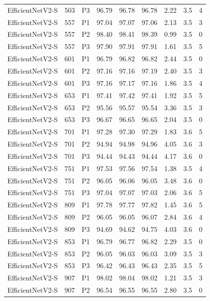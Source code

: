 {\begin{longtable}{lrlrrrrrr}
EfficientNetV2-S & 503 & P3 & 96.79 & 96.78 & 96.78 & 2.22 & 3.5 & 4 \\
EfficientNetV2-S & 557 & P1 & 97.04 & 97.07 & 97.06 & 2.13 & 3.5 & 3 \\
EfficientNetV2-S & 557 & P2 & 98.40 & 98.41 & 98.39 & 0.99 & 3.5 & 0 \\
EfficientNetV2-S & 557 & P3 & 97.90 & 97.91 & 97.91 & 1.61 & 3.5 & 5 \\
EfficientNetV2-S & 601 & P1 & 96.79 & 96.82 & 96.82 & 2.44 & 3.5 & 0 \\
EfficientNetV2-S & 601 & P2 & 97.16 & 97.16 & 97.19 & 2.40 & 3.5 & 3 \\
EfficientNetV2-S & 601 & P3 & 97.16 & 97.17 & 97.16 & 1.86 & 3.5 & 4 \\
EfficientNetV2-S & 653 & P1 & 97.41 & 97.42 & 97.41 & 1.92 & 3.5 & 5 \\
EfficientNetV2-S & 653 & P2 & 95.56 & 95.57 & 95.54 & 3.36 & 3.5 & 3 \\
EfficientNetV2-S & 653 & P3 & 96.67 & 96.65 & 96.65 & 2.04 & 3.5 & 0 \\
EfficientNetV2-S & 701 & P1 & 97.28 & 97.30 & 97.29 & 1.83 & 3.6 & 5 \\
EfficientNetV2-S & 701 & P2 & 94.94 & 94.98 & 94.96 & 4.05 & 3.6 & 3 \\
EfficientNetV2-S & 701 & P3 & 94.44 & 94.43 & 94.44 & 4.17 & 3.6 & 0 \\
EfficientNetV2-S & 751 & P1 & 97.53 & 97.56 & 97.54 & 1.38 & 3.5 & 4 \\
EfficientNetV2-S & 751 & P2 & 96.05 & 96.06 & 96.05 & 3.48 & 3.6 & 0 \\
EfficientNetV2-S & 751 & P3 & 97.04 & 97.07 & 97.03 & 2.06 & 3.6 & 5 \\
EfficientNetV2-S & 809 & P1 & 97.78 & 97.77 & 97.82 & 1.45 & 3.6 & 5 \\
EfficientNetV2-S & 809 & P2 & 96.05 & 96.05 & 96.07 & 2.84 & 3.6 & 4 \\
EfficientNetV2-S & 809 & P3 & 94.69 & 94.62 & 94.75 & 4.03 & 3.6 & 0 \\
EfficientNetV2-S & 853 & P1 & 96.79 & 96.77 & 96.82 & 2.29 & 3.5 & 0 \\
EfficientNetV2-S & 853 & P2 & 96.05 & 96.03 & 96.03 & 3.09 & 3.5 & 3 \\
EfficientNetV2-S & 853 & P3 & 96.42 & 96.43 & 96.43 & 2.35 & 3.5 & 5 \\
EfficientNetV2-S & 907 & P1 & 98.02 & 98.04 & 98.02 & 1.21 & 3.5 & 3 \\
EfficientNetV2-S & 907 & P2 & 96.54 & 96.55 & 96.55 & 2.80 & 3.5 & 0 \\

\end{longtable}}
